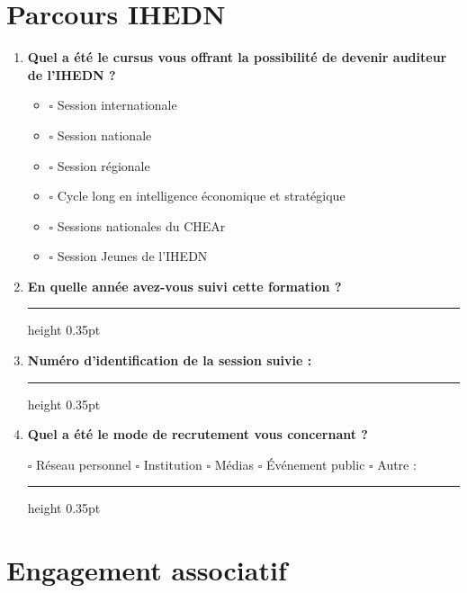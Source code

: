 \documentclass[12pt,a4paper]{article}
\newcommand{\Case}{\(\square\)}
\newcommand{\Ligne}{\leavevmode\leaders\hrule height 0.35pt\hfill\kern0pt}
\newcommand{\Question}[1]{\item \textbf{#1}\par\vspace{0.1em}}
\begin{document}
\section{Parcours IHEDN}

\begin{enumerate}[label=\textbf{\arabic*.},leftmargin=0pt,itemindent=1.9em,labelwidth=1.4em,labelsep=0.5em,resume]

\Question{Quel a été le cursus vous offrant la possibilité de devenir auditeur de l'IHEDN ?}

\begin{itemize}[leftmargin=1.5cm]
    \item[] \Case{} Session internationale
    \item[] \Case{} Session nationale
    \item[] \Case{} Session régionale
    \item[] \Case{} Cycle long en intelligence économique et stratégique
    \item[] \Case{} Sessions nationales du CHEAr
    \item[] \Case{} Session Jeunes de l'IHEDN
\end{itemize}

\Question{En quelle année avez-vous suivi cette formation ?}

\Ligne

\Question{Numéro d'identification de la session suivie :}

\Ligne

\Question{Quel a été le mode de recrutement vous concernant ?}

\Case{} Réseau personnel \hspace{1cm} \Case{} Institution \hspace{1cm} \Case{} Médias \hspace{1cm} \Case{} Événement public \hspace{1cm} \Case{} Autre : \Ligne

\end{enumerate}

\section{Engagement associatif}
\end{document}
